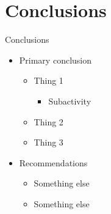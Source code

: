 \section{Conclusions}
\begin{frame}

	\Large%
		Conclusions

	\normalsize%
		\begin{itemize}
			\setlength\itemsep{2em}
			\item Primary conclusion
			\begin{itemize}
				\item Thing 1
				\begin{itemize}
					\item Subactivity
				\end{itemize}
				\item Thing 2
				\item Thing 3
			\end{itemize}
			\item Recommendations
			\begin{itemize}
				\item Something else
				\item Something else
			\end{itemize}
		\end{itemize}
\end{frame}